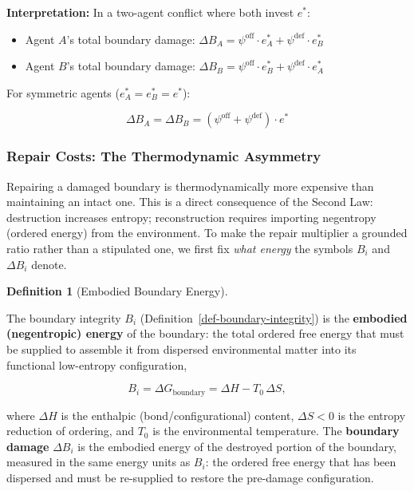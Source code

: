 \documentclass[11pt]{article}
\theoremstyle{plain}
\theoremstyle{definition}
\newtheorem{definition}{Definition}
\theoremstyle{remark}
\let\origsubsubsection\subsubsection
\renewcommand{\subsubsection}{\needspace{4\baselineskip}\origsubsubsection}
\providecommand{\tightlist}{%
  \setlength{\itemsep}{0pt}\setlength{\parskip}{0pt}}
\begin{document}
\textbf{Interpretation:} In a two-agent conflict where both invest
\(e^*\):

\begin{itemize}
\tightlist
\item
  Agent \(A\)'s total boundary damage:
  \(\Delta B_A = \psi^{\text{off}} \cdot e_A^* + \psi^{\text{def}} \cdot e_B^*\)
\item
  Agent \(B\)'s total boundary damage:
  \(\Delta B_B = \psi^{\text{off}} \cdot e_B^* + \psi^{\text{def}} \cdot e_A^*\)
\end{itemize}

For symmetric agents (\(e_A^* = e_B^* = e^*\)):

\[\Delta B_A = \Delta B_B = (\psi^{\text{off}} + \psi^{\text{def}}) \cdot e^*\]

\subsubsection{Repair Costs: The Thermodynamic
Asymmetry}\label{repair-costs-the-thermodynamic-asymmetry}

Repairing a damaged boundary is thermodynamically more expensive than
maintaining an intact one. This is a direct consequence of the Second
Law: destruction increases entropy; reconstruction requires importing
negentropy (ordered energy) from the environment. To make the repair
multiplier a grounded ratio rather than a stipulated one, we first fix
\emph{what energy} the symbols \(B_i\) and \(\Delta B_i\) denote.

\begin{definition}[Embodied Boundary Energy]
\label{def-embodied-energy}

The boundary integrity $B_i$ (Definition~\ref{def-boundary-integrity}) is the \textbf{embodied (negentropic) energy} of the boundary: the total ordered free energy that must be supplied to assemble it from dispersed environmental matter into its functional low-entropy configuration,

$$B_i = \Delta G_{\text{boundary}} = \Delta H - T_0 \, \Delta S,$$

where $\Delta H$ is the enthalpic (bond/configurational) content, $\Delta S < 0$ is the entropy reduction of ordering, and $T_0$ is the environmental temperature. The \textbf{boundary damage} $\Delta B_i$ is the embodied energy of the destroyed portion of the boundary, measured in the same energy units as $B_i$: the ordered free energy that has been dispersed and must be re-supplied to restore the pre-damage configuration.
\end{definition}
\end{document}
